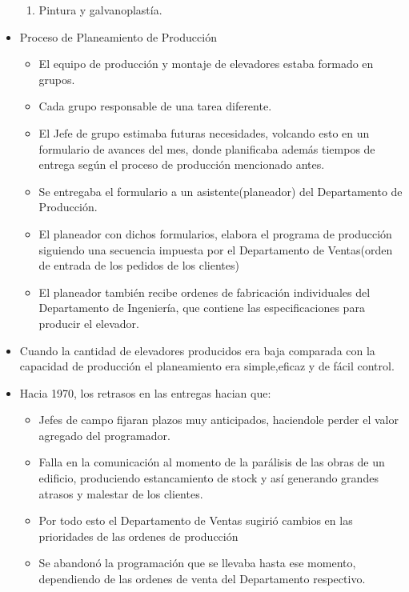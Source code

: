 \documentclass[12pt,a4paper,spanish]{article}
\begin{document}
\begin{itemize}
\begin{enumerate}
		\item Pintura y galvanoplast\'ia.
	\end{enumerate}
	\item Proceso de Planeamiento de Producci\'{o}n
	\begin{itemize}
		\item El equipo de producci\'{o}n y montaje de elevadores estaba formado en grupos.
		\item Cada grupo responsable de una tarea diferente.
		\item El Jefe de grupo estimaba futuras necesidades, volcando esto en un formulario de avances del mes, donde planificaba adem\'{a}s tiempos de entrega seg\'{u}n el proceso de producci\'{o}n mencionado antes.
		\item  Se entregaba el formulario a un asistente(planeador) del Departamento de Producci\'{o}n.
		\item El planeador con dichos formularios, elabora el programa de producci\'{o}n siguiendo una secuencia impuesta por el Departamento de Ventas(orden de entrada de los pedidos de los clientes)
		\item El planeador tambi\'{e}n recibe ordenes de fabricaci\'{o}n individuales del Departamento de Ingenier\'{i}a, que contiene las especificaciones para producir el elevador.
	\end{itemize}
	\item Cuando la cantidad de elevadores producidos era baja comparada con la capacidad de producci\'{o}n el planeamiento era simple,eficaz y de f\'{a}cil control. 
	\item Hacia 1970, los retrasos en las entregas hacian que:
	\begin{itemize}
		\item Jefes de campo fijaran plazos muy anticipados, haciendole perder el valor agregado del programador.
		\item Falla en la comunicaci\'{o}n al momento de la par\'{a}lisis de las obras de un edificio, produciendo estancamiento de stock y as\'{i} generando grandes atrasos y malestar de los clientes.
		\item Por todo esto el Departamento de Ventas sugiri\'{o} cambios en las prioridades de las ordenes de producci\'{o}n
		\item Se abandon\'{o} la programaci\'{o}n que se llevaba hasta ese momento, dependiendo de las ordenes de venta del Departamento respectivo.
	\end{itemize}
\end{itemize}
\end{document}
